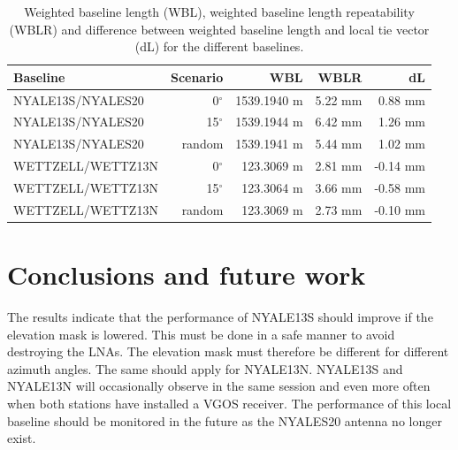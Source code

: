 \documentclass[twoside=semi,fontsize=12pt,paper=a4,titlepage=on]{kv_article}
\begin{document}
\begin{table}[t]
	\begin{tabularx}{\linewidth}{X|r|r|r|r}
	Baseline & Scenario & WBL & WBLR & dL \\
	\hline
	NYALE13S/NYALES20 & {0$^\circ$} & 1539.1940 m & 5.22 mm & 0.88 mm \\
	NYALE13S/NYALES20 & {15$^\circ$} & 1539.1944 m & 6.42 mm & 1.26 mm \\
	NYALE13S/NYALES20 & random & 1539.1941 m & 5.44 mm & 1.02 mm \\
	WETTZELL/WETTZ13N & {0$^\circ$} & 123.3069 m & 2.81 mm & -0.14 mm \\
	WETTZELL/WETTZ13N & {15$^\circ$} & 123.3064 m & 3.66 mm & -0.58 mm \\
	WETTZELL/WETTZ13N & random & 123.3069 m & 2.73 mm & -0.10 mm \\
	\hline
	\end{tabularx}
\caption{{Weighted baseline length (WBL), weighted baseline length repeatability (WBLR) and difference 
between weighted baseline length and local tie vector (dL) for the different baselines.
}}
\label{tab:baselines}
\end{table}

\section{Conclusions and future work}
The results indicate that the performance of NYALE13S should improve if the elevation mask is lowered. This must be done in a safe manner to avoid destroying the LNAs. The elevation mask must therefore be different for different azimuth angles. The same should apply for NYALE13N. NYALE13S and NYALE13N will occasionally observe in the same session and even more often when both stations have installed a VGOS receiver. The performance of this local baseline should be monitored in the future as the NYALES20 antenna no longer exist. 

\newpage


\end{document}
